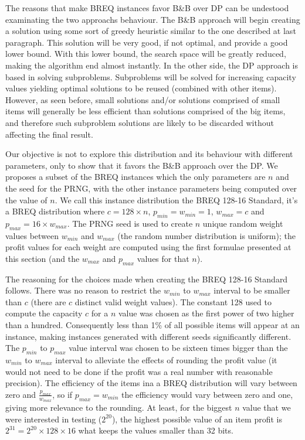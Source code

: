 The reasons that make BREQ instances favor B\&B over DP can be undestood examinating the two approachs behaviour. The B\&B approach will begin creating a solution using some sort of greedy heuristic similar to the one described at last paragraph. This solution will be very good, if not optimal, and provide a good lower bound. With this lower bound, the search space will be greatly reduced, making the algorithm end almost instantly. In the other side, the DP approach is based in solving subproblems. Subproblems will be solved for increasing capacity values yielding optimal solutions to be reused (combined with other items). However, as seen before, small solutions and/or solutions comprised of small items will generally be less efficient than solutions comprised of the big items, and therefore such subproblem solutions are likely to be discarded without affecting the final result.

Our objective is not to explore this distribution and its behaviour with different parameters, only to show that it favors the B\&B approach over the DP. We proposes a subset of the BREQ instances which the only parameters are \(n\) and the seed for the PRNG, with the other instance parameters being computed over the value of \(n\). We call this instance distribution the BREQ 128-16 Standard, it's a BREQ distribution where \(c = 128 \times n\), \(p_{min} = w_{min} = 1\), \(w_{max} = c\) and \(p_{max} = 16 \times w_{max}\). The PRNG seed is used to create \(n\) unique random weight values between \(w_{min}\) and \(w_{max}\) (the random number distribution is uniform); the profit values for each weight are computed using the first formulae presented at this section (and the \(w_{max}\) and \(p_{max}\) values for that \(n\)). 

The reasoning for the choices made when creating the BREQ 128-16 Standard follows. There was no reason to restrict the \(w_{min}\) to \(w_{max}\) interval to be smaller than \(c\) (there are \(c\) distinct valid weight values). The constant 128 used to compute the capacity \(c\) for a \(n\) value was chosen as the first power of two higher than a hundred. Consequently less than 1\% of all possible items will appear at an instance, making instances generated with different seeds significantly different. The \(p_{min}\) to \(p_{max}\) value interval was chosen to be sixteen times bigger than the \(w_{min}\) to \(w_{max}\) interval to alleviate the effects of rounding the profit value (it would not need to be done if the profit was a real number with reasonable precision). The efficiency of the items ina a BREQ distribution will vary between zero and \(\frac{p_{max}}{w_{max}}\), so if \(p_{max} = w_{min}\) the efficiency would vary between zero and one, giving more relevance to the rounding. At least, for the biggest \(n\) value that we were interested in testing (\(2^20\)), the highest possible value of an item profit is \(2^{31} = 2^{20}\times128\times16\) what keeps the values smaller than 32 bits.

